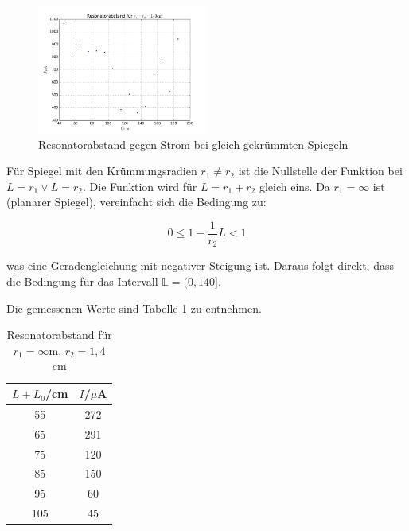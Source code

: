 \begin{figure}
	\centering
		\includegraphics[width=0.5\textwidth]{stabil1.png}
	\caption{Resonatorabstand gegen Strom bei gleich gekrümmten Spiegeln}
	\label{fig:stabil1}
\end{figure}

\noindent Für Spiegel mit den Krümmungsradien \(r_1\neq r_2\) ist die Nullstelle der Funktion bei \(L=r_1\lor L=r_2\). Die Funktion wird für \(L=r_1+r_2\) gleich eins. Da \(r_1=\infty\) ist (planarer Spiegel), vereinfacht sich die Bedingung zu:

\begin{equation}
0\le1-\frac{1}{r_2}L<1
\end{equation}

\noindent was eine Geradengleichung mit negativer Steigung ist. Daraus folgt direkt, dass die Bedingung für das Intervall \(\mathbb{L}=(0,140]\).

\noindent Die gemessenen Werte sind Tabelle \ref{tab:t2} zu entnehmen.

\begin{table}[H]
	\begin{center}
		\begin{tabular}{c c}
			\toprule
			\(L+L_0\)/cm & \(I\)/\(\mu\)A \\
			\midrule
			55              &272          \\                                                                           
			65              &291        \\                                                                             
			75              &120      \\                                                                               
			85              &150    \\                                                                                 
			95              &60    \\                                                                                  
			105             &45 \\
			\bottomrule
		\end{tabular}
		\caption{Resonatorabstand für \(r_1=\infty\text{m}\), \(r_2=1,4\)cm}
		\label{tab:t2}
	\end{center}
\end{table}

